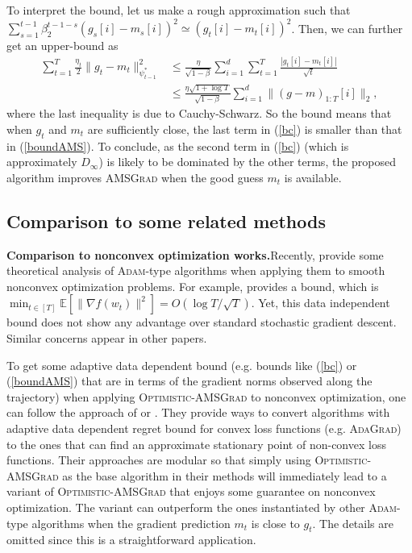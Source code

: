 \documentclass[11pt]{article}
\theoremstyle{k}
\begin{document}
To interpret the bound, let us make a rough approximation such that
$\sum_{s=1}^{t-1} \beta_2^{t-1-s} (g_{s}[i] - m_{s}[i])^2  \simeq (g_{t}[i] - m_t[i])^2 $.
Then, we can further get an upper-bound as \begin{align*}
    \sum_{t=1}^T \frac{\eta_t}{2} \|g_t - m_t  \|_{\psi_{t-1}^*}^2 &\leq
    \frac{\eta}{\sqrt{1 - \beta}} \sum_{i=1}^d \sum_{t=1}^{T} \frac{ | g_{t}[i] - m_{t}[i] | }{ \sqrt{t} }\\
    &\leq \frac{\eta \sqrt{1 + \log T}}{\sqrt{1 - \beta}} \sum_{i=1}^d \| (g-m)_{1:T}[i] \|_2 ,
\end{align*}
where the last inequality is due to Cauchy-Schwarz. So the bound means that when
$g_{t}$ and $m_t$ are sufficiently close, the last term in (\ref{bc})
is smaller than that in (\ref{boundAMS}).
To conclude, as the second term in (\ref{bc}) (which is approximately $D_{\infty}$) is likely to be dominated by the other terms, the proposed algorithm improves \textsc{AMSGrad} when the good guess $m_t$ is available.

\subsection{Comparison to some related methods} \label{app:related}

\textbf{Comparison to nonconvex optimization works.}\hspace{0.1in}Recently, \cite{ZRSKK18,CLSH19,WWB18,ZTYCG18,ZS18,LO18} provide some theoretical analysis 
of \textsc{Adam}-type algorithms when applying them to smooth nonconvex optimization problems.
For example, \cite{CLSH19} provides a bound,
which is $\min_{t \in [T]} \mathbb{E}[\| \nabla f(w_t) \|^2 ] = O(\log T / \sqrt{T}) $.
Yet, this data independent bound does not show any advantage over standard stochastic gradient descent. Similar concerns appear in other papers.

To get some adaptive data dependent bound (e.g. bounds like (\ref{bc}) or (\ref{boundAMS})
that are in terms of the gradient norms observed along the trajectory) when applying 
\textsc{Optimistic-AMSGrad} to nonconvex optimization,
one can follow the approach of \cite{Princeton18} or \cite{CYYZC19}.
They provide ways to convert algorithms with adaptive data dependent regret bound
for convex loss functions (e.g. \textsc{AdaGrad}) to the ones that can find an approximate stationary point of non-convex loss functions. 
Their approaches are modular so that simply using \textsc{Optimistic-AMSGrad}
as the base algorithm in their methods will immediately lead to a variant of \textsc{Optimistic-AMSGrad} that enjoys some guarantee on nonconvex optimization.
The variant can outperform the ones instantiated by other \textsc{Adam}-type algorithms when
the gradient prediction $m_t$ is close to $g_t$.
The details are omitted since this is a straightforward application.
\end{document}
